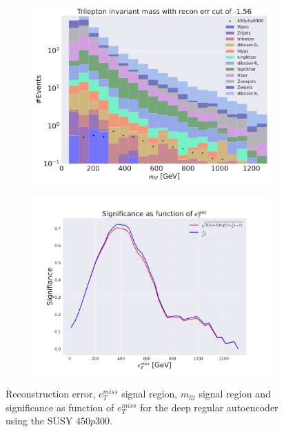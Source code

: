 \begin{figure}[H]
    \hfill
    \begin{subfigure}{.49\textwidth}
        \includegraphics[width=\textwidth]{Figures/AE_testing/big/3lep/b_data_recon_big_rm3_feats_sig_450p0p0300_mlll_recon_errcut_-1.56.pdf}
        \caption{}
        \label{fig:AE_3lep_big_mlll_450}
    \end{subfigure}
    \hfill   
    \begin{subfigure}{.49\textwidth}
        \includegraphics[width=\textwidth]{Figures/AE_testing/big/3lep/significance_etmiss_450p0p0300_-1.5648275418402864.pdf}
        \caption{}
        \label{fig:AE_3lep_big_signi_450}
    \end{subfigure}
    \hfill      
    \caption[3lep deep network | $450p300$ | AE]{Reconstruction error, $e_T^{miss}$ signal region, $m_{lll}$ signal region and significance as function of 
    $e_T^{miss}$ for the deep regular autoencoder using the SUSY $450p300$.}
    \label{fig:AE_3lep_big_rec_sig_signi_450}
\end{figure}


